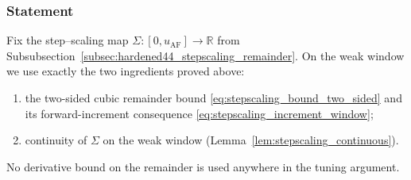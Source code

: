 \subsubsection{Statement}
Fix the step--scaling map $\Sigma:[0,u_{\mathrm{AF}}]\to\mathbb R$ from Subsubsection~\ref{subsec:hardened44_stepscaling_remainder}.
On the weak window we use exactly the two ingredients proved above:
\begin{enumerate}[leftmargin=*]
\item the two-sided cubic remainder bound \eqref{eq:stepscaling_bound_two_sided} and its forward-increment consequence \eqref{eq:stepscaling_increment_window};
\item continuity of $\Sigma$ on the weak window (Lemma~\ref{lem:stepscaling_continuous}).
\end{enumerate}
No derivative bound on the remainder is used anywhere in the tuning argument.

